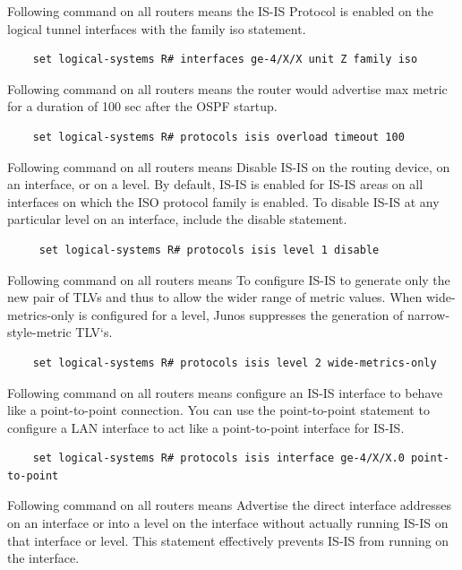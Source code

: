 \documentclass[a4paper]{article}
\begin{document}
Following command on all routers means the IS-IS Protocol is enabled on the logical tunnel interfaces with the family iso statement.

\begin{verbatim}
    set logical-systems R# interfaces ge-4/X/X unit Z family iso 
\end{verbatim}


Following command on all routers means the router would advertise max metric for a duration of 100 sec after the OSPF startup.

\begin{verbatim}    
    set logical-systems R# protocols isis overload timeout 100
\end{verbatim}



Following command on all routers means Disable IS-IS on the routing device, on an interface, or on a level. By default, IS-IS is enabled for IS-IS areas on all interfaces on which the ISO protocol family is enabled. To disable IS-IS at any particular level on an interface, include the disable statement.

\begin{verbatim}
     set logical-systems R# protocols isis level 1 disable
\end{verbatim}


Following command on all routers means To configure IS-IS to generate only the new pair of TLVs and thus to allow the wider range of metric values. When wide-metrics-only is configured for a level, Junos suppresses the generation of narrow-style-metric TLV`s.

\begin{verbatim}    
    set logical-systems R# protocols isis level 2 wide-metrics-only
\end{verbatim}

Following command on all routers means configure an IS-IS interface to behave like a point-to-point connection. You can use the point-to-point statement to configure a LAN interface to act like a point-to-point interface for IS-IS.

\begin{verbatim}    
    set logical-systems R# protocols isis interface ge-4/X/X.0 point-to-point
\end{verbatim}


Following command on all routers means Advertise the direct interface addresses on an interface or into a level on the interface without actually running IS-IS on that interface or level. This statement effectively prevents IS-IS from running on the interface. 
\end{document}
